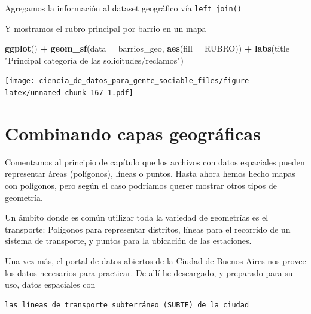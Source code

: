 \documentclass[]{book}
\newenvironment{Shaded}{\begin{snugshade}}{\end{snugshade}}
\newcommand{\KeywordTok}[1]{\textcolor[rgb]{0.13,0.29,0.53}{\textbf{#1}}}
\newcommand{\DataTypeTok}[1]{\textcolor[rgb]{0.13,0.29,0.53}{#1}}
\newcommand{\StringTok}[1]{\textcolor[rgb]{0.31,0.60,0.02}{#1}}
\newcommand{\OperatorTok}[1]{\textcolor[rgb]{0.81,0.36,0.00}{\textbf{#1}}}
\newcommand{\NormalTok}[1]{#1}
\begin{document}
Agregamos la información al dataset geográfico vía \texttt{left\_join()}

\begin{Shaded}
\end{Shaded}

Y mostramos el rubro principal por barrio en un mapa

\begin{Shaded}
\begin{Highlighting}[]
\KeywordTok{ggplot}\NormalTok{() }\OperatorTok{+}\StringTok{ }
\StringTok{    }\KeywordTok{geom_sf}\NormalTok{(}\DataTypeTok{data =}\NormalTok{ barrios_geo, }\KeywordTok{aes}\NormalTok{(}\DataTypeTok{fill =}\NormalTok{ RUBRO)) }\OperatorTok{+}
\StringTok{    }\KeywordTok{labs}\NormalTok{(}\DataTypeTok{title =} \StringTok{"Principal categoría de las solicitudes/reclamos"}\NormalTok{)}
\end{Highlighting}
\end{Shaded}

\texttt{[image: ciencia\_de\_datos\_para\_gente\_sociable\_files/figure-latex/unnamed-chunk-167-1.pdf]}

\section{Combinando capas
geográficas}\label{combinando-capas-geograficas}

Comentamos al principio de capítulo que los archivos con datos
espaciales pueden representar áreas (polígonos), líneas o puntos. Hasta
ahora hemos hecho mapas con polígonos, pero según el caso podríamos
querer mostrar otros tipos de geometría.

Un ámbito donde es común utilizar toda la variedad de geometrías es el
transporte: Polígonos para representar distritos, líneas para el
recorrido de un sistema de transporte, y puntos para la ubicación de las
estaciones.

Una vez más, el portal de datos abiertos de la Ciudad de Buenos Aires
nos provee los datos necesarios para practicar. De allí he descargado, y
preparado para su uso, datos espaciales con

\begin{verbatim}
las líneas de transporte subterráneo (SUBTE) de la ciudad
\end{verbatim}
\end{document}
